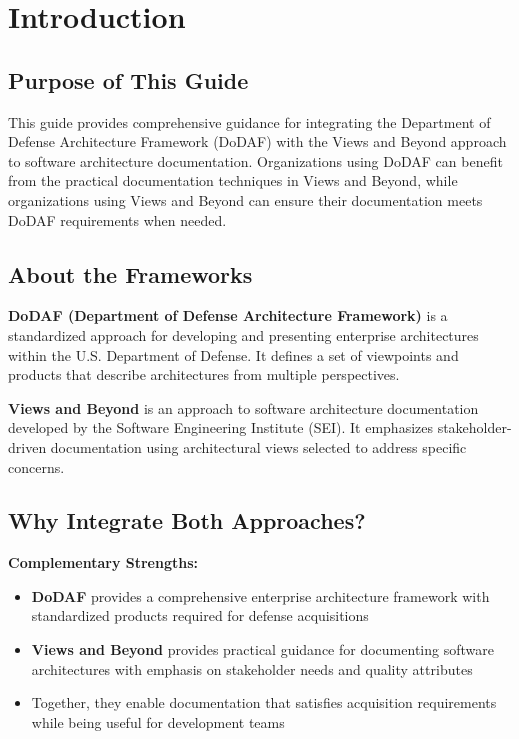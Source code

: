 \documentclass[11pt]{article}
\begin{document}
\newpage
\tableofcontents
\newpage

\section{Introduction}

\subsection{Purpose of This Guide}

This guide provides comprehensive guidance for integrating the Department of Defense Architecture Framework (DoDAF) with the Views and Beyond approach to software architecture documentation. Organizations using DoDAF can benefit from the practical documentation techniques in Views and Beyond, while organizations using Views and Beyond can ensure their documentation meets DoDAF requirements when needed.

\subsection{About the Frameworks}

\begin{definition}
\textbf{DoDAF (Department of Defense Architecture Framework)} is a standardized approach for developing and presenting enterprise architectures within the U.S. Department of Defense. It defines a set of viewpoints and products that describe architectures from multiple perspectives.
\end{definition}

\begin{definition}
\textbf{Views and Beyond} is an approach to software architecture documentation developed by the Software Engineering Institute (SEI). It emphasizes stakeholder-driven documentation using architectural views selected to address specific concerns.
\end{definition}

\subsection{Why Integrate Both Approaches?}

\begin{keypoint}
\textbf{Complementary Strengths:}

\begin{itemize}
    \item \textbf{DoDAF} provides a comprehensive enterprise architecture framework with standardized products required for defense acquisitions
    \item \textbf{Views and Beyond} provides practical guidance for documenting software architectures with emphasis on stakeholder needs and quality attributes
    \item Together, they enable documentation that satisfies acquisition requirements while being useful for development teams
\end{itemize}
\end{keypoint}
\end{document}
